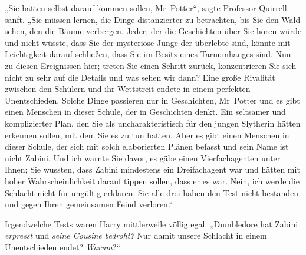 „Sie hätten selbst darauf kommen sollen, Mr~Potter“, sagte Professor Quirrell sanft.
„Sie müssen lernen, die Dinge distanzierter zu betrachten, bis Sie den Wald sehen, den die Bäume verbergen. Jeder, der die Geschichten über Sie hören würde und nicht wüsste, dass Sie der mysteriöse Junge-der-überlebte sind, könnte mit Leichtigkeit darauf schließen, dass Sie im Besitz eines Tarnumhanges sind. Nun zu diesen Ereignissen hier; treten Sie einen Schritt zurück, konzentrieren Sie sich nicht zu sehr auf die Details und was sehen wir dann? Eine große Rivalität zwischen den Schülern und ihr Wettstreit endete in einem perfekten Unentschieden. Solche Dinge passieren nur in Geschichten, Mr~Potter und es gibt einen Menschen in dieser Schule, der in Geschichten denkt. Ein seltsamer und komplizierter Plan, den Sie als uncharakteristisch für den jungen Slytherin hätten erkennen sollen, mit dem Sie es zu tun hatten. Aber es gibt einen Menschen in dieser Schule, der sich mit solch elaborierten Plänen befasst und sein Name ist nicht Zabini. Und ich warnte Sie davor, es gäbe einen Vierfachagenten unter Ihnen; Sie wussten, dass Zabini mindestens ein Dreifachagent war und hätten mit hoher Wahrscheinlichkeit darauf tippen sollen, dass er es war. Nein, ich werde die Schlacht nicht für ungültig erklären. Sie alle drei haben den Test nicht bestanden und gegen Ihren gemeinsamen Feind verloren.“

Irgendwelche Tests waren Harry mittlerweile völlig egal.
„Dumbledore hat Zabini \emph{erpresst} und \emph{seine Cousine bedroht?} Nur damit unsere Schlacht in einem Unentschieden endet? \emph{Warum}?“

